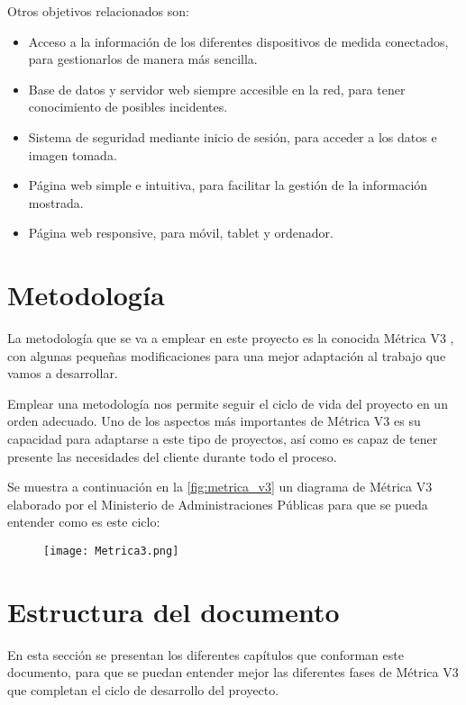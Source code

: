 Otros objetivos relacionados son:
\begin{itemize}
	\item Acceso a la información de los diferentes dispositivos de medida conectados, para gestionarlos de manera más sencilla.
	      \pagebreak
	      
	\item Base de datos y servidor web siempre accesible en la red, para tener conocimiento de posibles incidentes.
	\item Sistema de seguridad mediante inicio de sesión, para acceder a los datos e imagen tomada.
	\item Página web simple e intuitiva, para facilitar la gestión de la información mostrada.
	\item Página web responsive, para móvil, tablet y ordenador.
\end{itemize}

\section{Metodología}
La metodología que se va a emplear en este proyecto es la conocida Métrica V3 \cite{portal_administracion_electronica_metrica_nodate}, con algunas pequeñas modificaciones para una mejor adaptación al trabajo que vamos a desarrollar.

Emplear una metodología nos permite seguir el ciclo de vida del proyecto en un orden adecuado. Uno de los aspectos más importantes de Métrica V3 es su capacidad para adaptarse a este tipo de proyectos, así como es capaz de tener presente  las necesidades del cliente durante todo el proceso.

Se muestra a continuación en la \autoref{fig:metrica_v3} un diagrama de Métrica V3 elaborado por el Ministerio de Administraciones Públicas para que se pueda entender como es este ciclo:

\begin{figure}[H]
	{\texttt{[image: Metrica3.png]}}
\end{figure}

\section{Estructura del documento}
En esta sección se presentan los diferentes capítulos que conforman este documento, para que se puedan entender mejor las diferentes fases de Métrica V3 que completan el ciclo de desarrollo del proyecto. 

